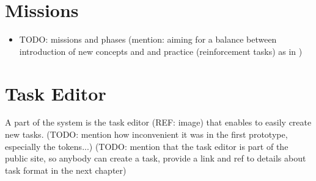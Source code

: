 

\section{Missions}
\begin{itemize}
\item TODO: missions and phases (mention: aiming for a balance between introduction of new concepts and and practice (reinforcement tasks) as in \cite{progression-analysis})
\end{itemize}


\section{Task Editor}  %
\label{sec:robomission.task-editor}

A part of the system is the task editor (REF: image)
that enables to easily create new tasks.
(TODO: mention how inconvenient it was in the first prototype, especially the tokens...)
(TODO: mention that the task editor is part of the public site, so anybody can create a task, provide a link and ref to details about task format in the next chapter)


